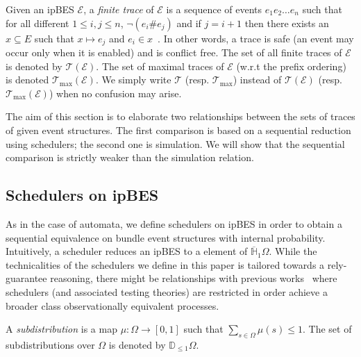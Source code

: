 \documentclass[review]{elsart}
\newcommand{\Hip}{\overline{\mathbb{H}}_1}
\newcommand{\Jip}{\mathbb{D}_{\le1}}
\newcommand{\EE}{\mathcal{E}}
\newcommand{\TT}{\mathcal{T}}
\newcommand{\Tx}{\color{orange}}
\begin{document}
Given an ipBES $\EE$, a \emph{finite trace} of $\EE$ is a sequence of events $e_1e_2\dots e_n$ such that for all different $1\leq i,j\leq n$, $\neg (e_i\#e_j)$ and if $j {=} i{+}1$ then there exists an $x\subseteq E$ such that $x{\mapsto} e_j$ and $e_i{\in} x$~\cite{Lan92,Kat96,Rab13}. In other words, a trace is safe (an event may occur only when it is enabled) and is conflict free. The set of all finite traces of $\EE$ is denoted by $\TT(\EE)$. The set of maximal traces of $\EE$ (w.r.t the prefix ordering) is denoted $\TT_{\max}(\EE)$. We simply write $\TT$ (resp. $\TT_{\max}$) instead of $\TT(\EE)$ (resp. $\TT_{\max}(\EE)$) when no confusion may arise.

The aim of this section is to elaborate two relationships between the sets of traces of given event structures. The first comparison is based on a sequential reduction using schedulers; the second one is simulation. We will show that the sequential comparison is strictly weaker than the simulation relation.

\subsection{Schedulers on ipBES}\label{sec:scheduler}

{\Tx
As in the case of automata, we define schedulers on ipBES in order to obtain a sequential equivalence on bundle event structures with internal probability. Intuitively, a scheduler reduces an ipBES to a element of $\Hip\Omega$. While the technicalities of the schedulers we define in this paper is tailored towards a rely-guarantee reasoning, there might be relationships with previous works~\cite{Geo10,Geo12} where schedulers (and associated testing theories) are restricted in order achieve a broader class observationally equivalent processes. 
}

A \emph{subdistribution} is a map $\mu:\Omega\to[0,1]$ such that $\sum_{s{\in}\Omega}\mu(s)\leq 1$.  The set of subdistributions over $\Omega$ is denoted by $\Jip\Omega$.  
\end{document}
